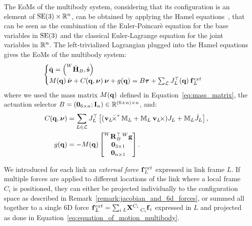 The \aclp{EoM} of the multibody system, considering that its configuration is an element of $\SE(3)\times\realn^n$, can be obtained by applying the Hamel equations~\parencite{marsden_jerrold_e_introduction_2010, maruskin_dynamical_2018}, that can be seen as the combination of the Euler-Poincarè equation for the base variables in $\SE(3)$ and the classical Euler-Lagrange equation for the joint variables in $\realn^n$.
The left-trivialized Lagrangian plugged into the Hamel equations gives the \acp{EoM} of the multibody system:
%
\begin{equation}
    \label{eq:equation_of_motion_multibody}
    \begin{cases}
        \Qud = \left( \homod[W]_B, \Shaped \right)  \\
        M(\Qu) \Nud + C(\Qu, \Nu) \Nu + g(\Qu) = B \Torques + \sum_{\mathcal{L}} J_{L}^\top(\Qu) \forcesix_L^{ext}
    \end{cases}
\end{equation}
%
where we used the mass matrix $M(\Qu)$ defined in Equation~\eqref{eq:mass_matrix}, the actuation selector $B = (\zeros_{6\times n}; \eye_n) \in \realn^{(6+n)\times n}$, and:
%
\begin{align*}
    C(\Qu, \Nu) &= \sum_{L\in\mathcal{L}} J_L^\top \left[ (\crossforsix[\velsix_L] \masssix_L + \masssix_L \crossvelsix[\velsix_L]) J_L + \masssix_L \dot{J}_L \right] ,\\
    g(\Qu) &= -M(\Qu) \begin{bmatrix}\rot[W]_B^\top \gravity[W] \\ \zeros_{3\times1} \\ \zeros_{n\times1}\end{bmatrix}
    .
\end{align*}

\begin{remark*}
%
We introduced for each link an \emph{external force} $\forcesix_L^{ext}$ expressed in link frame $L$.
If multiple forces are applied to different locations of the link where a local frame $C_i$ is positioned, they can either be projected individually to the configuration space as described in Remark~\ref{remark:jacobian_and_6d_forces}, or summed all together to a single 6D force $\forcesix_L^{ext} = \sum_i \transfor[L]^{C_i} \forcesix[C_i]_i$ expressed in $L$ and projected as done in Equation~\eqref{eq:equation_of_motion_multibody}.
%
\end{remark*}

